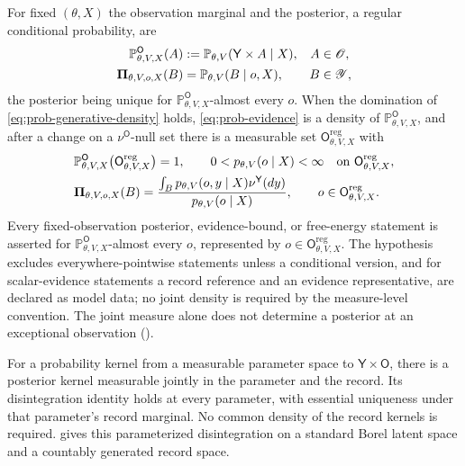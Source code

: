 For fixed $(\theta,X)$ the observation marginal and the posterior, a regular conditional probability, are
\begin{align}
\mathbb P_{\theta,V,X}^{\mathsf O}(A)&:=\mathbb P_{\theta,V}(\mathsf Y\times A\mid X),
&A&\in\mathscr O,
\label{eq:prob-observation-marginal}\\
\boldsymbol\Pi_{\theta,V,o,X}(B)&=\mathbb P_{\theta,V}(B\mid o,X),
&B&\in\mathscr Y,
\label{eq:prob-rcp}
\end{align}
the posterior being unique for $\mathbb P_{\theta,V,X}^{\mathsf O}$-almost every $o$. When the domination of
\eqref{eq:prob-generative-density} holds, \eqref{eq:prob-evidence} is a density of
$\mathbb P_{\theta,V,X}^{\mathsf O}$, and after a change on a $\nu^{\mathsf O}$-null set there is a
measurable set $\mathsf O_{\theta,V,X}^{\mathrm{reg}}$ with
\begin{align}
&\mathbb P_{\theta,V,X}^{\mathsf O}\bigl(\mathsf O_{\theta,V,X}^{\mathrm{reg}}\bigr)=1,
\qquad
0<p_{\theta,V}(o\mid X)<\infty
\quad\text{on }\mathsf O_{\theta,V,X}^{\mathrm{reg}},
\label{eq:prob-regular-observations}\\
&\boldsymbol\Pi_{\theta,V,o,X}(B)
=\frac{\int_Bp_{\theta,V}(o,y\mid X)\nu^{\mathsf Y}(dy)}{p_{\theta,V}(o\mid X)},
\qquad o\in\mathsf O_{\theta,V,X}^{\mathrm{reg}}.
\label{eq:prob-rcp-density}
\end{align}
Every fixed-observation posterior, evidence-bound, or free-energy statement is asserted for
$\mathbb P_{\theta,V,X}^{\mathsf O}$-almost every $o$, represented by
$o\in\mathsf O_{\theta,V,X}^{\mathrm{reg}}$. The hypothesis excludes everywhere-pointwise statements
unless a conditional version, and for scalar-evidence statements a record
reference and an evidence representative, are declared as model data; no
joint density is required by the measure-level convention. The joint
measure alone does not determine a posterior at an exceptional observation
().

For a probability kernel from a measurable parameter space to
$\mathsf Y\times\mathsf O$, there is a posterior kernel measurable jointly
in the parameter and the record. Its disintegration identity holds at every
parameter, with essential uniqueness under that parameter's record marginal.
No common density of the record kernels is required.
\citet[Thm.~2.29(1), Thm.~B.6]{Forre2026Transitional} gives this
parameterized disintegration on a standard Borel latent space and a
countably generated record space. 


